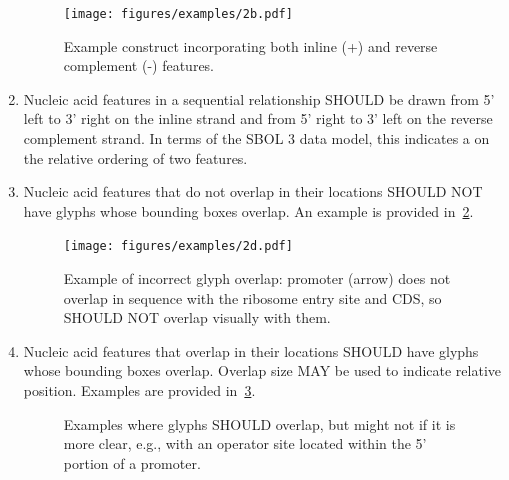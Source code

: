 \begin{enumerate}
	\begin{figure}[h!]
	\centering
	\texttt{[image: figures/examples/2b.pdf]}
	\caption{Example construct incorporating both inline (+) and reverse complement (-) features.}
	\label{exa:2b}
	\end{figure} 

\item Nucleic acid features in a sequential relationship SHOULD be drawn from 5' left to 3' right on the inline strand and from 5' right to 3' left on the reverse complement strand.
	In terms of the SBOL 3 data model, this indicates a  on the relative ordering of two features.

\item Nucleic acid features that do not overlap in their locations SHOULD NOT have glyphs whose bounding boxes overlap.
	An example is provided in~\ref{exa:2d}.
	\begin{figure}[h!]
	\centering
	\texttt{[image: figures/examples/2d.pdf]}
	\caption{Example of incorrect glyph overlap: promoter (arrow) does not overlap in sequence with the ribosome entry site and CDS, so SHOULD NOT overlap visually with them.}
	\label{exa:2d}
	\end{figure}

\item Nucleic acid features that overlap in their locations SHOULD have glyphs whose bounding boxes overlap.  Overlap size MAY be used to indicate relative position.
	Examples are provided in~\ref{exa:2e}.

	\begin{figure}[h!]
	\centering
	\caption{Examples where glyphs SHOULD overlap, but might not if it is more clear, e.g., with an operator site located within the 5' portion of a promoter.}
	\label{exa:2e}
	\end{figure}


\end{enumerate}

